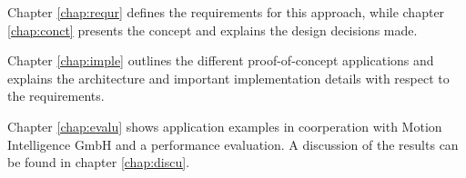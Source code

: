    Chapter \ref{chap:requr} defines the requirements for this approach, while
    chapter \ref{chap:conct} presents the concept and explains the design
    decisions made.\par

    Chapter \ref{chap:imple} outlines the different proof-of-concept
    applications and explains the architecture and important implementation
    details with respect to the requirements.\par

    Chapter \ref{chap:evalu} shows application examples in coorperation
    with Motion Intelligence GmbH and a performance evaluation. A discussion of
    the results can be found in chapter \ref{chap:discu}.\par
